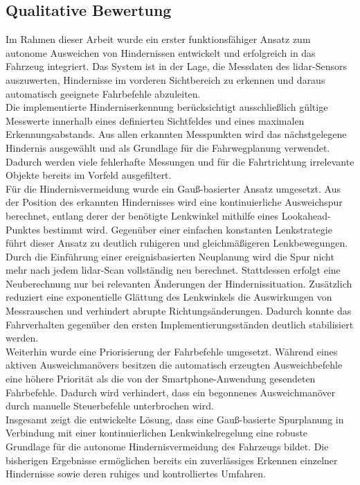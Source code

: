\subsection{Qualitative Bewertung}
Im Rahmen dieser Arbeit wurde ein erster funktionsfähiger Ansatz zum autonome Ausweichen von Hindernissen entwickelt und erfolgreich in das Fahrzeug integriert. Das System ist in der Lage, die Messdaten des \gls{lidar}-Sensors auszuwerten, Hindernisse im vorderen Sichtbereich zu erkennen und daraus automatisch geeignete Fahrbefehle abzuleiten.
\\
Die implementierte Hinderniserkennung berücksichtigt ausschließlich gültige Messwerte innerhalb eines definierten Sichtfeldes und eines maximalen Erkennungsabstands. Aus allen erkannten Messpunkten wird das nächstgelegene Hindernis ausgewählt und als Grundlage für die Fahrwegplanung verwendet. Dadurch werden viele fehlerhafte Messungen und für die Fahrtrichtung irrelevante Objekte bereits im Vorfeld ausgefiltert.
\\
Für die Hindernisvermeidung wurde ein Gauß-basierter Ansatz umgesetzt. Aus der Position des erkannten Hindernisses wird eine kontinuierliche Ausweichspur berechnet, entlang derer der benötigte Lenkwinkel mithilfe eines Lookahead-Punktes bestimmt wird. Gegenüber einer einfachen konstanten Lenkstrategie führt dieser Ansatz zu deutlich ruhigeren und gleichmäßigeren Lenkbewegungen.
\\
Durch die Einführung einer ereignisbasierten Neuplanung wird die Spur nicht mehr nach jedem \gls{lidar}-Scan vollständig neu berechnet. Stattdessen erfolgt eine Neuberechnung nur bei relevanten Änderungen der Hindernissituation. Zusätzlich reduziert eine exponentielle Glättung des Lenkwinkels die Auswirkungen von Messrauschen und verhindert abrupte Richtungsänderungen. Dadurch konnte das Fahrverhalten gegenüber den ersten Implementierungsständen deutlich stabilisiert werden.
\\
Weiterhin wurde eine Priorisierung der Fahrbefehle umgesetzt. Während eines aktiven Ausweichmanövers besitzen die automatisch erzeugten Ausweichbefehle eine höhere Priorität als die von der Smartphone-Anwendung gesendeten Fahrbefehle. Dadurch wird verhindert, dass ein begonnenes Ausweichmanöver durch manuelle Steuerbefehle unterbrochen wird.
\\
Insgesamt zeigt die entwickelte Lösung, dass eine Gauß-basierte Spurplanung in Verbindung mit einer kontinuierlichen Lenkwinkelregelung eine robuste Grundlage für die autonome Hindernisvermeidung des Fahrzeugs bildet. Die bisherigen Ergebnisse ermöglichen bereits ein zuverlässiges Erkennen einzelner Hindernisse sowie deren ruhiges und kontrolliertes Umfahren.

